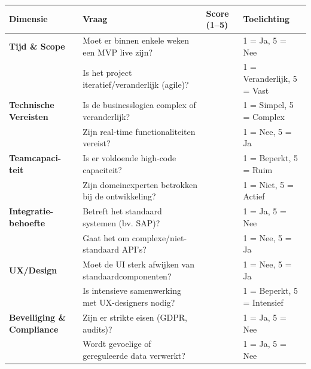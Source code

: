 \documentclass[a0,portrait]{hogent-poster}
\begin{document}
\begin{multicols}{2}
        \begin{center}
            \begin{minipage}{0.6\linewidth}
                \centering
                \scriptsize
                \renewcommand{\arraystretch}{1.2}
                \begin{tabular}{|p{3cm}|p{5cm}|p{1.2cm}|p{4.3cm}|}
                    \hline
                    \textbf{Dimensie} & \textbf{Vraag} & \textbf{Score (1–5)} & \textbf{Toelichting} \\
                    \hline
                    \textbf{Tijd \& Scope} & Moet er binnen enkele weken een MVP live zijn? & & 1 = Ja, 5 = Nee \\
                    \cline{2-4}
                    & Is het project iteratief/veranderlijk (agile)? & & 1 = Veranderlijk, 5 = Vast \\
                    \hline
                    \textbf{Technische Vereisten} & Is de businesslogica complex of veranderlijk? & & 1 = Simpel, 5 = Complex \\
                    \cline{2-4}
                    & Zijn real-time functionaliteiten vereist? & & 1 = Nee, 5 = Ja \\
                    \hline
                    \textbf{Teamcapaci- teit} & Is er voldoende high-code capaciteit? & & 1 = Beperkt, 5 = Ruim \\
                    \cline{2-4}
                    & Zijn domeinexperten betrokken bij de ontwikkeling? & & 1 = Niet, 5 = Actief \\
                    \hline
                    \textbf{Integratie- behoefte} & Betreft het standaard systemen (bv. SAP)? & & 1 = Ja, 5 = Nee \\
                    \cline{2-4}
                    & Gaat het om complexe/niet-standaard API's? & & 1 = Nee, 5 = Ja \\
                    \hline
                    \textbf{UX/Design} & Moet de UI sterk afwijken van standaardcomponenten? & & 1 = Nee, 5 = Ja \\
                    \cline{2-4}
                    & Is intensieve samenwerking met UX-designers nodig? & & 1 = Beperkt, 5 = Intensief \\
                    \hline
                    \textbf{Beveiliging \& Compliance} & Zijn er strikte eisen (GDPR, audits)? & & 1 = Ja, 5 = Nee \\
                    \cline{2-4}
                    & Wordt gevoelige of gereguleerde data verwerkt? & & 1 = Ja, 5 = Nee \\

\end{tabular}
\end{minipage}
\end{center}
\end{multicols}
\end{document}
